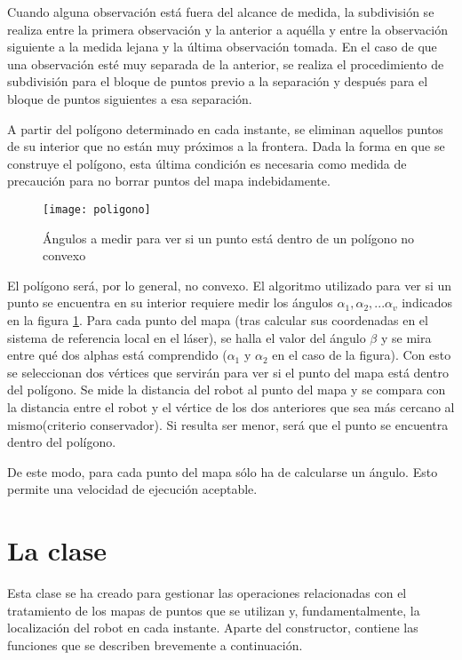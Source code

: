 Cuando alguna observación está fuera del alcance de medida, la subdivisión se realiza entre la primera observación y la anterior a aquélla y entre la observación siguiente a la medida lejana y la última observación tomada. En el caso de que una observación esté muy separada de la anterior, se realiza el procedimiento de subdivisión para el bloque de puntos previo a la separación y después para el bloque de puntos siguientes a esa separación.

A partir del polígono determinado en cada instante, se eliminan aquellos puntos de su interior que no están muy próximos a la frontera. Dada la forma en que se construye el polígono, esta última condición es necesaria como medida de precaución para no borrar puntos del mapa indebidamente.

\begin{figure}[h]
  \centering\texttt{[image: poligono]}\\
  \caption{ Ángulos a medir para ver si un punto está dentro de un polígono no convexo}\label{fg:poligono}
\end{figure}


El polígono será, por lo general, no convexo. El algoritmo utilizado para ver si un punto se encuentra en su interior requiere medir los ángulos $\alpha_{1},\alpha_{2},...\alpha_{v}$ indicados en la figura \ref{fg:poligono}. Para cada punto del mapa (tras calcular sus coordenadas en el sistema de referencia local en el láser), se halla el valor del ángulo $\beta$ y se mira entre qué dos alphas está comprendido ($\alpha_{1}$ y $\alpha_{2}$ en el caso de la figura). Con esto se seleccionan dos vértices que servirán para ver si el punto del mapa está dentro del polígono. Se mide la distancia del robot al punto del mapa y se compara con la distancia entre el robot y el vértice de los dos anteriores que sea más cercano al mismo(criterio conservador). Si resulta ser menor, será que el punto se encuentra dentro del polígono.

De este modo, para cada punto del mapa sólo ha de calcularse un ángulo. Esto permite una velocidad de ejecución aceptable.

\section{La clase }
Esta clase se ha creado para gestionar las operaciones relacionadas con el tratamiento de los mapas de puntos que se utilizan y, fundamentalmente, la localización del robot en cada instante. Aparte del constructor, contiene las funciones que se describen brevemente a continuación.

